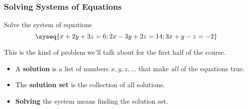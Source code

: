 
\iffalse %
\begin{frame}
\frametitle{Number of Solutions}

\begin{bluebox}{.65\textwidth}
  In general, a system of linear equations can have:

  \smallskip
  \begin{itemize}
    \pause
  \item Zero solutions (\emph{inconsistent});
    \pause
  \item One solution;
    \pause
  \item Infinitely many solutions.
  \end{itemize}
\end{bluebox}

\onslide<5->{We will verify this later on.}

\end{frame}
\fi



\begin{frame}
\frametitle{Solving Systems of Equations}

\vskip-3mm
\begin{eg}
  Solve the system of equations
  \[\syseq{x + 2y + 3z = 6;
    2x - 3y + 2z = 14;
    3x + y - z = -2
  }\]
\end{eg}

This is the kind of problem we'll talk about for the first half of the course.

\pause

\begin{bluebox}{.6\textwidth}
  \begin{itemize}
  \item A \textbf{solution} is a list of numbers $x,y,z,\ldots$ that make
    \emph{all} of the equations true.
    \pause
  \item The \textbf{solution set} is the collection of all solutions.
    \pause
  \item \textbf{Solving} the system means finding the solution set.
  \end{itemize}
\end{bluebox}


\end{frame}


